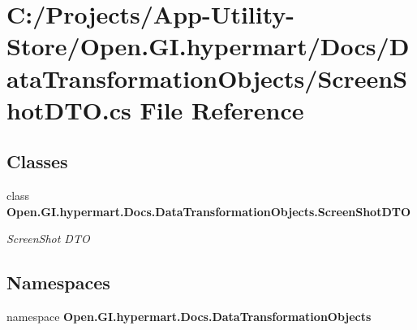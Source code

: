 \section{C\+:/\+Projects/\+App-\/\+Utility-\/\+Store/\+Open.G\+I.\+hypermart/\+Docs/\+Data\+Transformation\+Objects/\+Screen\+Shot\+D\+TO.cs File Reference}
\label{_screen_shot_d_t_o_8cs}
\subsection*{Classes}
\begin{DoxyCompactItemize}
\item 
class \textbf{ Open.\+G\+I.\+hypermart.\+Docs.\+Data\+Transformation\+Objects.\+Screen\+Shot\+D\+TO}
\begin{DoxyCompactList}\small\item\em Screen\+Shot D\+TO \end{DoxyCompactList}\end{DoxyCompactItemize}
\subsection*{Namespaces}
\begin{DoxyCompactItemize}
\item 
namespace \textbf{ Open.\+G\+I.\+hypermart.\+Docs.\+Data\+Transformation\+Objects}
\end{DoxyCompactItemize}
